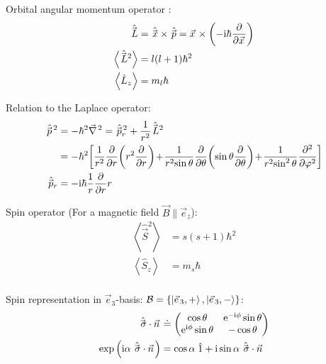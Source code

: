 		\noindent
		Orbital angular momentum operator :
		\begin{equation}
			\begin{aligned}
				\hat{\vec{L}} &= \hat{\vec{x}}\times \hat{\vec{p}} = \vec{x}\times\left(-\i\hbar\pdv{\vec{x}}\right) \\
				\left< \hat{\vec{L}}^2 \right> &= l(l+1)\hbar^2 \\
				\left< \hat{L}_z \right> &= m_l \hbar \\
			\end{aligned}
		\end{equation}

		\noindent
		Relation to the Laplace operator:
		\begin{equation}
			\begin{aligned}
				\hat{\vec{p}}^{\,2} &= -\hbar^2 \Nabla^2 = \hat{\vec{p}}_r^{\,2} + \frac{1}{r^2} \hat{\vec{L}}^2 \\
				&= -\hbar^2 \qty[{\displaystyle \frac{1}{r^{2}} \frac{\partial }{\partial r}\!\left(r^{2}\frac{\partial }{\partial r}\right)\!+\!\frac{1}{r^{2}\!\sin \theta } \frac{\partial }{\partial \theta }\!\left(\sin \theta \frac{\partial }{\partial \theta }\right)\!+\!\frac{1}{r^{2}\!\sin ^{2}\theta }\frac{\partial ^{2}}{\partial \varphi ^{2}}}]\\
				\hat{\vec{p}}_r &= -\i\hbar\frac{1}{r}\pdv{r}r \\
			\end{aligned}
		\end{equation}

		\noindent
		Spin operator  (For a magnetic field $\vec{B}\parallel\vec{e}_z$):
		\begin{equation}
			\begin{aligned}
				\left<\hat{\vec{S}}^2\right> &= s(s+1)\hbar^2 \\
				\left<\hat{S}_z\right> &= m_s \hbar \\
			\end{aligned}
		\end{equation}

		\noindent
		Spin representation in $\vec{e}_3$-basis: $\mathcal{B} = \{ \Ket{\vec{e}_3,+}, \Ket{\vec{e}_3,-} \}$:
		\begin{equation}
			\begin{aligned}
				\hat{\vec{\sigma}} \cdot \vec{n} &\doteq
				\left( \begin{matrix}
					\cos\theta & \ex^{-\i\phi}\sin\theta \\
					\ex^{\i\phi}\sin\theta & -\cos\theta \\
				\end{matrix} \right) \\
				\exp\left( \i\alpha \; \hat{\vec{\sigma}} \cdot \vec{n} \right) &= \cos\alpha \;\hat{1} + \i\sin\alpha \; \hat{\vec{\sigma}} \cdot \vec{n} \\
			\end{aligned}
		\end{equation}

